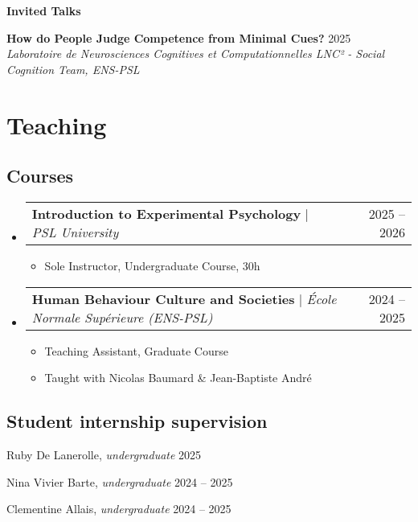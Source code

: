 \documentclass[letterpaper,11pt]{article}
\makeatletter
\newcommand{\resumeItem}[1]{
  \item\small{
    {#1 \vspace{-2pt}}
  }
}
\newcommand{\resumeItemWithYear}[3][ ]{ %
  \item\small{
    #2 \hfill {\small #3} \\
    #1
  }
}
\newcommand{\resumePublicationHeading}[1]{
  \vspace{5pt} %
  \noindent\textbf{\small #1} %
  \vspace{2pt} %
}
\newcommand{\resumeProjectHeading}[2]{
    \item
    \begin{tabular*}{0.97\textwidth}{l@{\extracolsep{\fill}}r}
      \small#1 & #2 \\
    \end{tabular*}\vspace{-7pt}
}
\newcommand{\resumeSubHeadingListStart}{\begin{itemize}[leftmargin=0.15in, label={}]}
\newcommand{\resumeSubHeadingListEnd}{\end{itemize}}
\newcommand{\resumeItemListStart}{\begin{itemize}}
\newcommand{\resumeItemListEnd}{\end{itemize}\vspace{-5pt}}
\makeatother
\begin{document}
\resumePublicationHeading{Invited Talks}
\begin{etaremune}
  \resumeItemWithYear{\textbf{How do People Judge Competence from Minimal Cues?}}{2025}{\textit{Laboratoire de Neurosciences Cognitives et Computationnelles LNC² - Social Cognition Team, ENS-PSL}}
\end{etaremune}

\section{Teaching}

\subsection*{Courses}
    \resumeSubHeadingListStart
    \resumeProjectHeading
        {\textbf{Introduction to Experimental Psychology} $|$ \emph{PSL University}}{2025 -- 2026}
        \resumeItemListStart
          \resumeItem{Sole Instructor, Undergraduate Course, 30h}
        \resumeItemListEnd
    \resumeSubHeadingListEnd
    \resumeSubHeadingListStart
      \resumeProjectHeading
          {\textbf{Human Behaviour Culture and Societies} $|$ \emph{École Normale Supérieure (ENS-PSL)}}{2024 -- 2025}
          \resumeItemListStart
            \resumeItem{Teaching Assistant, Graduate Course}
            \resumeItem{Taught with Nicolas Baumard \& Jean-Baptiste André}
          \resumeItemListEnd
    \resumeSubHeadingListEnd



\subsection*{Student internship supervision}

\begin{etaremune}
    \resumeItemWithYear{Ruby De Lanerolle, \textit{undergraduate}}{2025}
    \resumeItemWithYear{Nina Vivier Barte, \textit{undergraduate}}{2024 -- 2025}
    \resumeItemWithYear{Clementine Allais, \textit{undergraduate}}{2024 -- 2025}
\end{etaremune}
\end{document}
